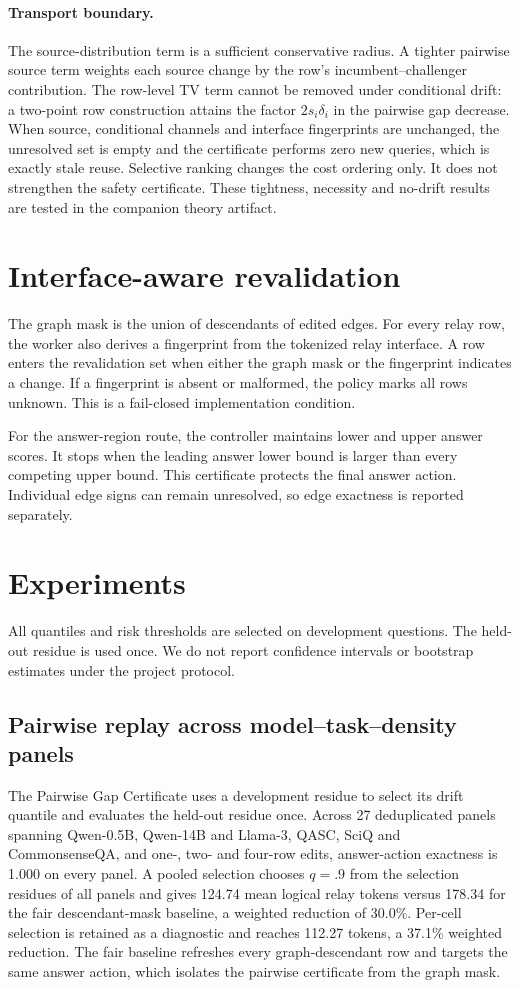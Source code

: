 \documentclass[11pt]{article}
\begin{document}
\paragraph{Transport boundary.}
The source-distribution term is a sufficient conservative radius. A tighter pairwise source term weights each source change by the row's incumbent--challenger contribution. The row-level TV term cannot be removed under conditional drift: a two-point row construction attains the factor $2s_i\delta_i$ in the pairwise gap decrease. When source, conditional channels and interface fingerprints are unchanged, the unresolved set is empty and the certificate performs zero new queries, which is exactly stale reuse. Selective ranking changes the cost ordering only. It does not strengthen the safety certificate. These tightness, necessity and no-drift results are tested in the companion theory artifact.

\section{Interface-aware revalidation}
The graph mask is the union of descendants of edited edges. For every relay row, the worker also derives a fingerprint from the tokenized relay interface. A row enters the revalidation set when either the graph mask or the fingerprint indicates a change. If a fingerprint is absent or malformed, the policy marks all rows unknown. This is a fail-closed implementation condition.

For the answer-region route, the controller maintains lower and upper answer scores. It stops when the leading answer lower bound is larger than every competing upper bound. This certificate protects the final answer action. Individual edge signs can remain unresolved, so edge exactness is reported separately.

\section{Experiments}
All quantiles and risk thresholds are selected on development questions. The held-out residue is used once. We do not report confidence intervals or bootstrap estimates under the project protocol.

\subsection{Pairwise replay across model--task--density panels}
The Pairwise Gap Certificate uses a development residue to select its drift quantile and evaluates the held-out residue once. Across 27 deduplicated panels spanning Qwen-0.5B, Qwen-14B and Llama-3, QASC, SciQ and CommonsenseQA, and one-, two- and four-row edits, answer-action exactness is 1.000 on every panel. A pooled selection chooses $q=.9$ from the selection residues of all panels and gives 124.74 mean logical relay tokens versus 178.34 for the fair descendant-mask baseline, a weighted reduction of 30.0\%. Per-cell selection is retained as a diagnostic and reaches 112.27 tokens, a 37.1\% weighted reduction. The fair baseline refreshes every graph-descendant row and targets the same answer action, which isolates the pairwise certificate from the graph mask.
\end{document}
